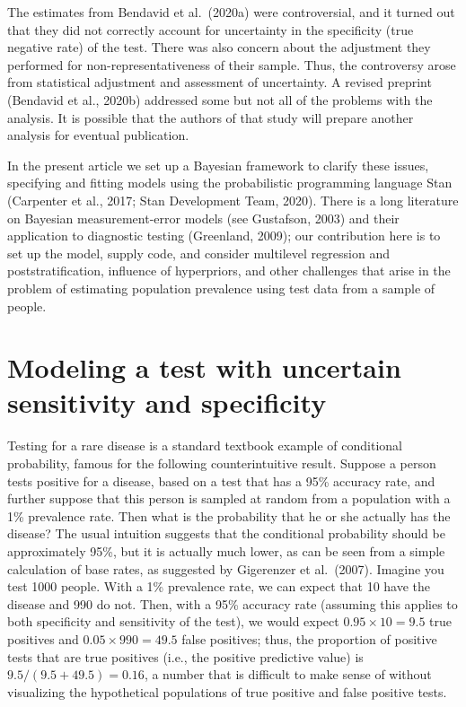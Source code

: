 \documentclass[11pt]{article}
\begin{document}
The estimates from Bendavid et al.\ (2020a) were controversial, and it
turned out that they did not correctly account for uncertainty in the
specificity (true negative rate) of the test.  There was also concern
about the adjustment they performed for non-representativeness of
their sample.  Thus, the controversy arose from statistical adjustment
and assessment of uncertainty.  A revised preprint (Bendavid et al.,
2020b) addressed some but not all of the problems with the analysis.
It is possible that the authors of that study will prepare another
analysis for eventual publication.

In the present article we set up a Bayesian framework to clarify these
issues, specifying and fitting models using the probabilistic
programming language Stan (Carpenter et al., 2017; Stan Development
Team, 2020).  There is a long literature on Bayesian measurement-error
models (see Gustafson, 2003) and their application to diagnostic
testing (Greenland, 2009); our contribution here is to set up the
model, supply code, and consider multilevel regression and
poststratification, influence of hyperpriors, and other challenges
that arise in the problem of estimating population prevalence using
test data from a sample of people.


\section{Modeling a test with uncertain sensitivity and specificity}\label{model1}

Testing for a rare disease is a standard textbook example of
conditional probability, famous for the following counterintuitive
result. Suppose a person tests positive for a disease, based on a test
that has a 95\% accuracy rate, and further suppose that this person is
sampled at random from a population with a 1\% prevalence rate.  Then
what is the probability that he or she actually has the disease? The
usual intuition suggests that the conditional probability should be
approximately 95\%, but it is actually much lower, as can be seen from
a simple calculation of base rates, as suggested by Gigerenzer et al.\
(2007).  Imagine you test 1000 people.  With a 1\% prevalence rate, we
can expect that 10 have the disease and 990 do not.  Then, with a 95\%
accuracy rate (assuming this applies to both specificity and
sensitivity of the test), we would expect $0.95 \times 10=9.5$ true
positives and $0.05 \times 990 = 49.5$ false positives; thus, the
proportion of positive tests that are true positives (i.e., the
positive predictive value) is $9.5/(9.5+49.5) = 0.16$, a number that is
difficult to make sense of without visualizing the hypothetical
populations of true positive and false positive tests.
\end{document}
